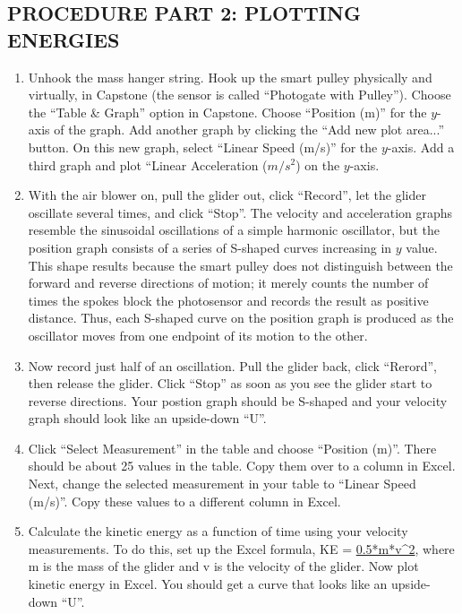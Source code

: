 \subsection*{PROCEDURE PART 2: PLOTTING ENERGIES}

\begin{enumerate}[label=\arabic*.]

\item Unhook the mass hanger string. Hook up the smart pulley physically and virtually, in Capstone (the sensor is called ``Photogate with Pulley'').  Choose the ``Table \& Graph'' option in Capstone.  Choose ``Position (m)'' for the \(y\)-axis of the graph.  Add another graph by clicking the ``Add new plot area...'' button.  On this new graph, select ``Linear Speed (m/s)'' for the \(y\)-axis.  Add a third graph and plot ``Linear Acceleration ($m/s^2$) on the \(y\)-axis.

\item With the air blower on, pull the glider out, click ``Record'', let the glider oscillate several times, and click ``Stop''.  The velocity and acceleration graphs resemble the sinusoidal oscillations of a simple harmonic oscillator, but the position graph consists of a series of S-shaped curves increasing in \(y\) value.  This shape results because the smart pulley does not distinguish between the forward and reverse directions of motion; it merely counts the number of times the spokes block the photosensor and records the result as positive distance.  Thus, each S-shaped curve on the position graph is produced as the oscillator moves from one endpoint of its motion to the other.

\item Now record just half of an oscillation.  Pull the glider back, click ``Rerord'', then release the glider.  Click ``Stop'' as soon as you see the glider start to reverse directions.  Your postion graph should be S-shaped and your velocity graph should look like an upside-down ``U''.

\item Click ``Select Measurement'' in the table and choose ``Position (m)''.  There should be about 25 values in the table.  Copy them over to a column in Excel.  Next, change the selected measurement in your table to ``Linear Speed (m/s)''.  Copy these values to a different column in Excel.

\item Calculate the kinetic energy as a function of time using your velocity measurements.  To do this, set up the Excel formula, KE = \url{0.5*m*v^2}, where m is the mass of the glider and v is the velocity of the glider.  Now plot kinetic energy in Excel.  You should get a curve that looks like an upside-down ``U''.


\end{enumerate}
